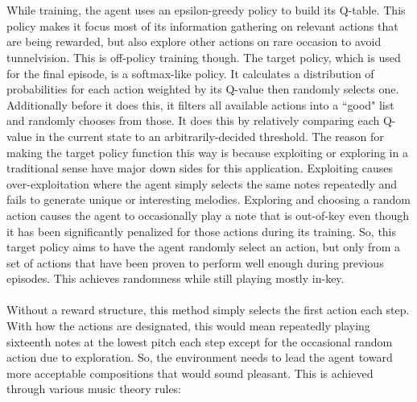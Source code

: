 \documentclass{article}
\begin{document}
\\\\While training, the agent uses an epsilon-greedy policy to build its Q-table. This policy makes it focus most of its information gathering on relevant actions that are being rewarded, but also explore other actions on rare occasion to avoid tunnelvision. This is off-policy training though. The target policy, which is used for the final episode, is a softmax-like policy. It calculates a distribution of probabilities for each action weighted by its Q-value then randomly selects one. Additionally before it does this, it filters all available actions into a ``good" list and randomly chooses from those. It does this by relatively comparing each Q-value in the current state to an arbitrarily-decided threshold. The reason for making the target policy function this way is because exploiting or exploring in a traditional sense have major down sides for this application. Exploiting causes over-exploitation where the agent simply selects the same notes repeatedly and fails to generate unique or interesting melodies. Exploring and choosing a random action causes the agent to occasionally play a note that is out-of-key even though it has been significantly penalized for those actions during its training. So, this target policy aims to have the agent randomly select an action, but only from a set of actions that have been proven to perform well enough during previous episodes. This achieves randomness while still playing mostly in-key.
\\\\Without a reward structure, this method simply selects the first action each step. With how the actions are designated, this would mean repeatedly playing sixteenth notes at the lowest pitch each step except for the occasional random action due to exploration. So, the environment needs to lead the agent toward more acceptable compositions that would sound pleasant. This is achieved through various music theory rules:
\end{document}

